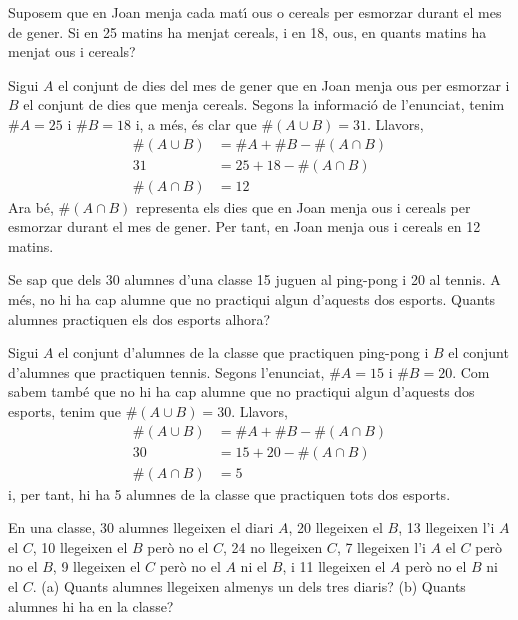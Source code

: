 \begin{exercici}
Suposem que en Joan menja cada mat\'{\i} ous o cereals per esmorzar durant
el mes de gener. Si en 25 matins ha menjat cereals, i en 18, ous, en quants
matins ha menjat ous i cereals?
\end{exercici}

\begin{solucio}
Sigui $A$ el conjunt de dies del mes de gener que en Joan menja ous per
esmorzar i $B$ el conjunt de dies que menja cereals. Segons la informaci\'{o}
de l'enunciat, tenim $\#A=25$ i $\#B=18$ i, a m\'{e}s, \'{e}s clar que $%
\#\left( A\cup B\right) =31$. Llavors,
\begin{align*}
\#\left( A\cup B\right) & =\#A+\#B-\#\left( A\cap B\right) \\
31& =25+18-\#\left( A\cap B\right) \\
\#\left( A\cap B\right) & =12
\end{align*}%
Ara b\'{e}, $\#\left( A\cap B\right) $ representa els dies que en Joan menja
ous i cereals per esmorzar durant el mes de gener. Per tant, en Joan menja
ous i cereals en 12 matins.
\end{solucio}

\begin{exercici}
Se sap que dels 30 alumnes d'una classe 15 juguen al ping-pong i 20 al
tennis. A m\'{e}s, no hi ha cap alumne que no practiqui algun d'aquests dos
esports. Quants alumnes practiquen els dos esports alhora?
\end{exercici}

\begin{solucio}
Sigui $A$ el conjunt d'alumnes de la classe que practiquen ping-pong i $B$
el conjunt d'alumnes que practiquen tennis. Segons l'enunciat, $\#A=15$ i $%
\#B=20$. Com sabem tamb\'{e} que no hi ha cap alumne que no practiqui algun
d'aquests dos esports, tenim que $\#\left( A\cup B\right) =30$. Llavors,%
\begin{align*}
\#\left( A\cup B\right) & =\#A+\#B-\#\left( A\cap B\right) \\
30& =15+20-\#\left( A\cap B\right) \\
\#\left( A\cap B\right) & =5
\end{align*}%
i, per tant, hi ha 5 alumnes de la classe que practiquen tots dos esports.
\end{solucio}

\begin{exercici}
En una classe, 30 alumnes llegeixen el diari $A$, 20 llegeixen el $B$, 13
llegeixen l'i $A$ el $C$, 10 llegeixen el $B$ per\`{o} no el $C$, 24 no
llegeixen $C$, 7 llegeixen l'i $A$ el $C$ per\`{o} no el $B$, 9 llegeixen el
$C$ per\`{o} no el $A$ ni el $B$, i 11 llegeixen el $A$ per\`{o} no el $B$
ni el $C$. (a) Quants alumnes llegeixen almenys un dels tres diaris? (b)
Quants alumnes hi ha en la classe?
\end{exercici}

